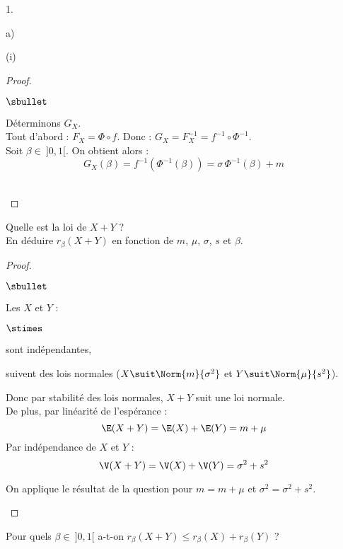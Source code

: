 \documentclass[11pt]{article}%
\begin{document}
\begin{noliste}{1.}
\begin{noliste}{a)}
\begin{nonoliste}{(i)}
\begin{proof}
\begin{noliste}{$\sbullet$}
	  
	  
	  \newpage
	  
	  
	  
	  \item Déterminons $G_X$.\\
	  Tout d'abord : $F_X=\Phi \circ f$. Donc :
	  $G_X=F_X^{-1} = f^{-1} \circ \Phi^{-1}$.\\
	  Soit $\beta \in \ ]0,1[$. On obtient alors :
	  \[
	    G_X(\beta) = f^{-1}(\Phi^{-1}(\beta)) = \sigma \,
	    \Phi^{-1}(\beta) +m
	  \]
	  ~\\[-1.4cm]
        \end{noliste}
      \end{proof}
    \end{nonoliste}
    
    \item Quelle est la loi de $X+Y$ ?\\
    En déduire $r_\beta(X+Y)$ en fonction de $m$, $\mu$, $\sigma$, 
    $s$ et $\beta$.
    
    \begin{proof}~
      \begin{noliste}{$\sbullet$}
	\item Les \var $X$ et $Y$ :
	\begin{noliste}{$\stimes$}
	  \item sont indépendantes,
	  \item suivent des lois normales ($X \suit \Norm{m}{
	  \sigma^2}$ et $Y \suit \Norm{\mu}{s^2}$).
	\end{noliste}
	Donc par stabilité des lois normales, $X+Y$ suit une loi 
	normale.\\
	De plus, par linéarité de l'espérance :
	\[
	  \E(X+Y) = \E(X) + \E(Y) = m+\mu
	\]
	Par indépendance de $X$ et $Y$ :
	\[
	  \V(X+Y) = \V(X)+\V(Y) = \sigma^2+s^2
	\]
	
	\item On applique le résultat de la question 
	pour $m=m+\mu$ et $\sigma^2=\sigma^2+s^2$.
	~\\[-1.4cm]
      \end{noliste}
    \end{proof}

    
    \item Pour quels $\beta \in \ ]0,1[$ a-t-on $r_{\beta}(X+Y) \leq
    r_\beta(X)+r_\beta(Y)$ ?
    

\end{noliste}
\end{noliste}
\end{document}
